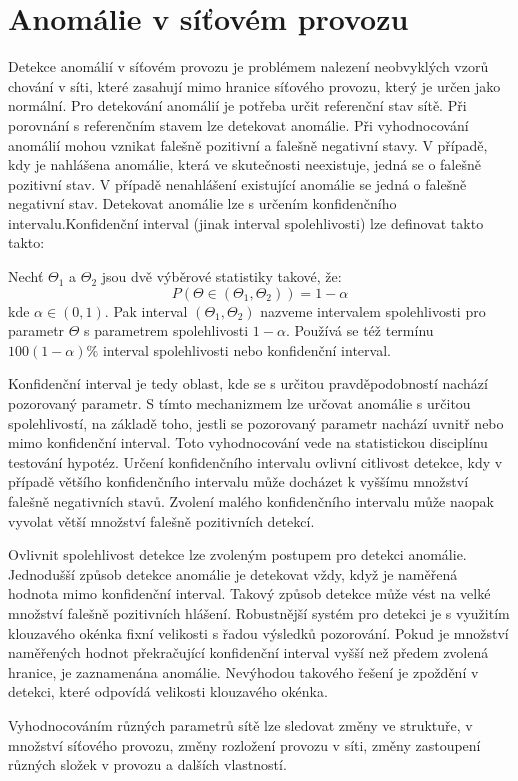 \documentclass[thesis=M,czech]{FITthesis}[2012/06/26]
\begin{document}
\section{Anomálie v síťovém provozu}
Detekce anomálií v síťovém provozu je problémem nalezení neobvyklých vzorů chování v síti, které zasahují mimo hranice síťového provozu, který je určen jako normální.\cite{anomaly} Pro detekování anomálií je potřeba určit referenční stav sítě. Při porovnání s referenčním stavem lze detekovat anomálie. Při vyhodnocování anomálií mohou vznikat falešně pozitivní a falešně negativní stavy. V případě, kdy je nahlášena anomálie, která ve skutečnosti neexistuje, jedná se o falešně pozitivní stav. V případě nenahlášení existující anomálie se jedná o falešně negativní stav. Detekovat anomálie lze s určením konfidenčního intervalu.\newline Konfidenční interval (jinak interval spolehlivosti) lze definovat takto takto:\par
Nechť $ \Theta_{1}$ a $\Theta_{2} $ jsou dvě výběrové statistiky takové, že:
\[ P(\Theta \in (\Theta_{1},\Theta_{2})) = 1 - \alpha \]
kde $\alpha \in (0,1)$. Pak interval $(\Theta_{1},\Theta_{2})$ nazveme intervalem spolehlivosti pro parametr $\Theta$ s parametrem spolehlivosti $1 - \alpha$. Používá se též termínu $100(1 - \alpha)\%$ interval spolehlivosti nebo konfidenční interval.\par
Konfidenční interval je tedy oblast, kde se s určitou pravděpodobností nachází pozorovaný parametr.\cite{confidenceinterval} S tímto mechanizmem lze určovat anomálie s určitou spolehlivostí, na základě toho, jestli se pozorovaný parametr nachází uvnitř nebo mimo konfidenční interval. Toto vyhodnocování vede na statistickou disciplínu testování hypotéz.\cite{hypothesistesting}
Určení konfidenčního intervalu ovlivní citlivost detekce, kdy v případě většího konfidenčního intervalu může docházet k vyššímu množství falešně negativních stavů. Zvolení malého konfidenčního intervalu může naopak vyvolat větší množství falešně pozitivních detekcí.\par 
Ovlivnit spolehlivost detekce lze zvoleným postupem pro detekci anomálie. Jednodušší způsob detekce anomálie je detekovat vždy, když je naměřená hodnota mimo konfidenční interval. Takový způsob detekce může vést na velké množství falešně pozitivních hlášení. Robustnější systém pro detekci je s využitím klouzavého okénka fixní velikosti s řadou výsledků pozorování. Pokud je množství naměřených hodnot překračující konfidenční interval vyšší než předem zvolená hranice, je zaznamenána anomálie.\cite{anomalydetection} Nevýhodou takového řešení je zpoždění v detekci, které odpovídá velikosti klouzavého okénka.
\par Vyhodnocováním různých parametrů sítě lze sledovat změny ve struktuře, v množství síťového provozu, změny rozložení provozu v síti, změny zastoupení různých složek v provozu a dalších vlastností.\par
\end{document}
